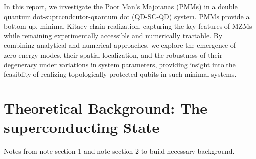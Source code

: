 \documentclass[11pt, letterpaper, titlepage]{article}
\begin{document}
In this report, we investigate the Poor Man's Majoranas (PMMs) in a double quantum dot-suprcondcutor-quantum dot (QD-SC-QD) system. PMMs provide a bottom-up, minimal Kitaev chain realization, capturing the key features of MZMs while remaining experimentally accessible and numerically tractable. By combining analytical and numerical approaches, we explore the emergence of zero-energy modes, their spatial localization, and the robustness of their degeneracy under variations in system parameters, providing insight into the feasiblity of realizing topologically protected qubits in such minimal systems.\\

\section{Theoretical Background: The superconducting State}
Notes from note section 1 and note section 2 to build necessary background.\par
\end{document}
